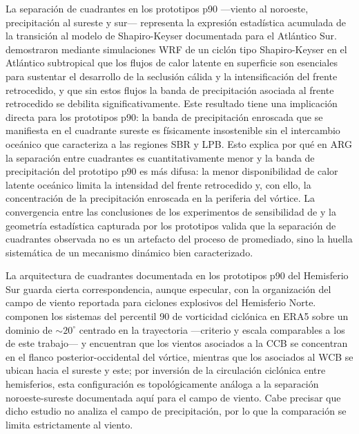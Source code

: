 
La separación de cuadrantes en los prototipos p90 —viento al noroeste, precipitación al sureste y sur— representa la expresión estadística acumulada de la transición al modelo de Shapiro-Keyser documentada para el Atlántico Sur. \citet{gozzo2013air} demostraron mediante simulaciones WRF de un ciclón tipo Shapiro-Keyser en el Atlántico subtropical que los flujos de calor latente en superficie son esenciales para sustentar el desarrollo de la seclusión cálida y la intensificación del frente retrocedido, y que sin estos flujos la banda de precipitación asociada al frente retrocedido se debilita significativamente. Este resultado tiene una implicación directa para los prototipos p90: la banda de precipitación enroscada que se manifiesta en el cuadrante sureste es físicamente insostenible sin el intercambio oceánico que caracteriza a las regiones SBR y LPB. Esto explica por qué en ARG la separación entre cuadrantes es cuantitativamente menor y la banda de precipitación del prototipo p90 es más difusa: la menor disponibilidad de calor latente oceánico limita la intensidad del frente retrocedido y, con ello, la concentración de la precipitación enroscada en la periferia del vórtice. La convergencia entre las conclusiones de los experimentos de sensibilidad de \citet{gozzo2013air} y la geometría estadística capturada por los prototipos valida que la separación de cuadrantes observada no es un artefacto del proceso de promediado, sino la huella sistemática de un mecanismo dinámico bien caracterizado.


La arquitectura de cuadrantes documentada en los prototipos p90 del Hemisferio Sur guarda cierta correspondencia, aunque especular, con la organización del campo de viento reportada para ciclones explosivos del Hemisferio Norte. \citet{priestley2022improved} componen los sistemas del percentil 90 de vorticidad ciclónica en ERA5 sobre un dominio de ${\sim}20^{\circ}$ centrado en la trayectoria —criterio y escala comparables a los de este trabajo— y encuentran que los vientos asociados a la CCB se concentran en el flanco posterior-occidental del vórtice, mientras que los asociados al WCB se ubican hacia el sureste y este; por inversión de la circulación ciclónica entre hemisferios, esta configuración es topológicamente análoga a la separación noroeste-sureste documentada aquí para el campo de viento. Cabe precisar que dicho estudio no analiza el campo de precipitación, por lo que la comparación se limita estrictamente al viento.

